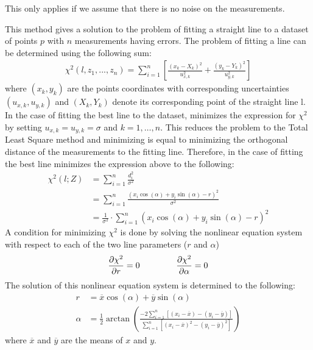 \documentclass[../Head/Main.tex]{subfiles}
\begin{document}
This only applies if we assume that there is no noise on the measurements. \par
This method gives a solution to the problem of fitting a straight line to a dataset of points $p$ with $n$ measurements having errors. The problem of fitting a line can be determined using the following sum:
\begin{align}
    \chi^2\left(l, z_1, ..., z_n\right) = \sum_{i = 1}^{n} \left[\frac{\left(x_k - X_k\right)^2}{u_{x, k}^{2}} + \frac{\left(y_k - Y_k\right)^2}{u_{y, k}^{2}}\right]
\end{align}
where $(x_k,y_k)$ are the points coordinates with corresponding uncertainties $(u_{x, k},u_{y, k})$ and $(X_k,Y_k)$ denote its corresponding point of the straight line l. In the case of fitting the best line to the dataset, minimizes the expression for $\chi^2$ by setting $u_{x, k}=u_{y, k}=\sigma$ and $k=1,…,n$. This reduces the problem to the Total Least Square method and minimizing is equal to minimizing the orthogonal distance of the measurements to the fitting line. Therefore, in the case  of fitting the best line minimizes the expression above to the following:
\begin{align}
    \chi^2\left(l; Z\right) &= \sum_{i = 1}^{n} \frac{d_i^2}{\sigma^2} \\
    &= \sum_{i = 1}^{n}\frac{\left(x_i\cos(\alpha) + y_i\sin⁡(\alpha)-r\right)^2}{\sigma^2}\\
    &= \frac{1}{\sigma^2}\cdot\sum_{i = 1}^{n}\left(x_i\cos(\alpha) + y_i\sin⁡(\alpha)-r\right)^2
\end{align}
A condition for minimizing $\chi^2$ is done by solving the nonlinear equation system with respect to each of the two line parameters ($r$ and $\alpha$)
\begin{align}
    \frac{\partial\chi^2}{\partial r} = 0 \hspace{1.5cm} \frac{\partial\chi^2}{\partial\alpha} = 0
\end{align}
The solution of this nonlinear equation system is determined to the following:
\begin{align}
	r &= \overline{x}\cos(\alpha)+\overline{y}\sin(\alpha) \label{eq:range} \\
    \alpha &= \frac{1}{2}\arctan\left(\frac{-2\sum_{i=1}^{n}\left[\left(x_i-\overline{x}\right) - \left(y_i-\overline{y}\right)\right]}{\sum_{i = 1}^{n}\left[\left(x_i-\overline{x}\right)^2 - \left(y_i-\overline{y}\right)^2\right]}\right) \label{eq:theta}
\end{align}
where $\overline{x}$ and $\overline{y}$ are the means of $x$ and $y$. \par
\end{document}
